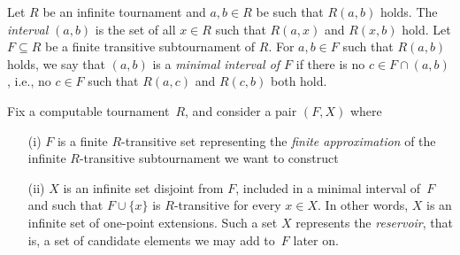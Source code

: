 \begin{definition}
Let $R$ be an infinite tournament and $a, b \in R$
be such that $R(a,b)$ holds. The \emph{interval} $(a,b)$ is the
set of all $x \in R$ such that $R(a,x)$ and $R(x,b)$ hold.
Let $F \subseteq R$ be a finite transitive subtournament of $R$.
For $a, b \in F$ such that $R(a,b)$ holds, we say that $(a,b)$
is a \emph{minimal interval of $F$} if there is no $c \in F \cap (a,b)$,
i.e., no $c \in F$ such that $R(a,c)$ and $R(c,b)$ both hold.
\end{definition}

Fix a computable tournament~$R$, and consider a pair $(F, X)$ where
\begin{itemize}
	\item[(i)] $F$ is a finite $R$-transitive set representing the \emph{finite approximation}
	of the infinite $R$-transitive subtournament we want to construct
	\item[(ii)] $X$ is an infinite set disjoint from $F$, included in a minimal interval of~$F$
	and such that $F \cup \{x\}$ is $R$-transitive for every $x \in X$. In other words,
	$X$ is an infinite set of one-point extensions.
	Such a set $X$ represents the \emph{reservoir}, that is, a set of candidate
	elements we may add to~$F$ later on.
\end{itemize}

